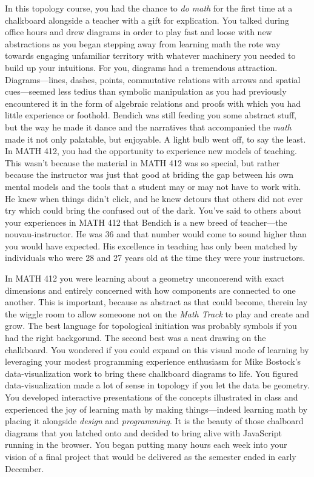 \documentclass[../main.tex]{subfiles}
\begin{document}
In this topology course, you had the chance to \textit{do math} for the first time at a chalkboard alongside a teacher with a gift for explication. You talked during office hours and drew diagrams in order to play fast and loose with new abstractions as you began stepping away from learning math the rote way towards engaging unfamiliar territory with whatever machinery you needed to build up your intuitions. For you, diagrams had a tremendous attraction. Diagrams---lines, dashes, points, commutative relations with arrows and spatial cues---seemed less tedius than symbolic manipulation as you had previously encountered it in the form of algebraic relations and proofs with which you had little experience or foothold. Bendich was still feeding you some abstract stuff, but the way he made it dance and the narratives that accompanied the \textit{math} made it not only palatable, but enjoyable. A light bulb went off, to say the least. In MATH 412, you had the opportunity to experience new models of teaching. This wasn't because the material in MATH 412 was so special, but rather because the instructor was just that good at briding the gap between his own mental models and the tools that a student may or may not have to work with. He knew when things didn't click, and he knew detours that others did not ever try which could bring the confused out of the dark. You've said to others about your experiences in MATH 412 that Bendich is a new breed of teacher---the nouvau-instructor. He was 36 and that number would come to sound higher than you would have expected. His excellence in teaching has only been matched by individuals who were 28 and 27 years old at the time they were your instructors.

In MATH 412 you were learning about a geometry unconcerend with exact dimensions and entirely concerned with how components are connected to one another. This is important, because as abstract as that could become, therein lay the wiggle room to allow someoone not on the \textit{Math Track} to play and create and grow. The best language for topological initiation was probably symbols if you had the right backgorund. The second best was a neat drawing on the chalkboard. You wondered if you could expand on this visual mode of learning by leveraging your modest programming experience enthusiasm for Mike Bostock's data-visualization work to bring these chalkboard diagrams to life. You figured data-visualization made a lot of sense in topology if you let the data be geometry. You developed interactive presentations of the concepts illustrated in class and experienced the joy of learning math by making things---indeed learning math by placing it alongside \textit{design} and \textit{programming}. It is the beauty of those chalboard diagrams that you latched onto and decided to bring alive with JavaScript running in the browser. You began putting many hours each week into your vision of a final project that would be delivered as the semester ended in early December.
\end{document}
